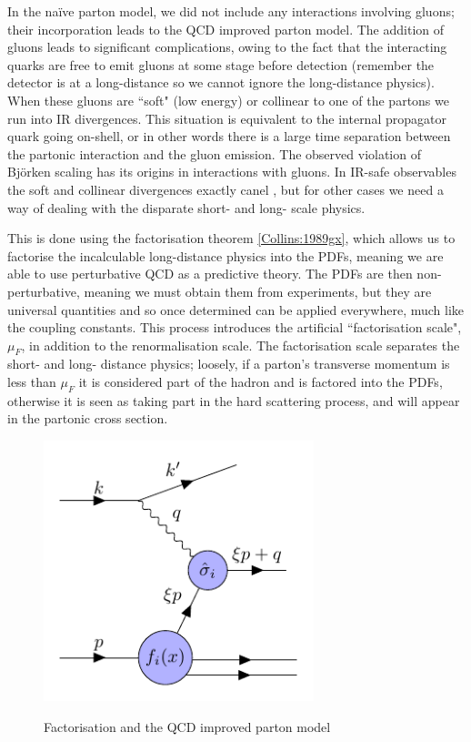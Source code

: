 In the na\"ive parton model, we did not include any interactions involving gluons; their incorporation leads to the QCD improved parton model. The addition of gluons leads to significant complications, owing to the fact that the interacting quarks are free to emit gluons at some stage before detection (remember the detector is at a long-distance so we cannot ignore the long-distance physics). When these gluons are ``soft" (low energy) or collinear to one of the partons we run into IR divergences. This situation is equivalent to the internal propagator quark going on-shell, or in other words there is a large time separation between the partonic interaction and the gluon emission. The observed violation of Bj\"orken scaling has its origins in interactions with gluons. In IR-safe observables the soft and collinear divergences exactly canel \cite{Kinoshita:1962ur, Lee:1964is}, but for other cases we need a way of dealing with the disparate short- and long- scale physics. 

This is done using the factorisation theorem \ref{Collins:1989gx}, which allows us to factorise the incalculable long-distance physics into the PDFs, meaning we are able to use perturbative QCD as a predictive theory. The PDFs are then non-perturbative, meaning we must obtain them from experiments, but they are universal quantities and so once determined can be applied everywhere, much like the coupling constants. This process introduces the artificial ``factorisation scale", $\mu_F$, in addition to the renormalisation scale. The factorisation scale separates the short- and long- distance physics; loosely, if a parton's transverse momentum is less than $\mu_F$ it is considered part of the hadron and is factored into the PDFs, otherwise it is seen as taking part in the hard scattering process, and will appear in the partonic cross section.

\begin{figure}[H]
\centering
\includegraphics[width=0.7\textwidth]{../diagrams/improvedparton_dis.pdf}
\label{fig:improvedparton}
\caption{Factorisation and the QCD improved parton model}
\end{figure}


